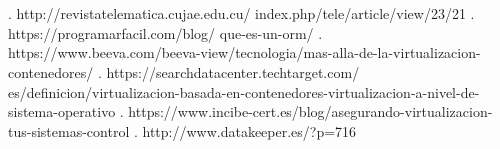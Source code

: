 \documentclass[twoside,twocolumn]{article}
\begin{document}
\begin{flushright}
\begin{itemize}
\textbf{}\\
\textbf{}\\

\begin{thebibliography}{99} %



. http://revistatelematica.cujae.edu.cu/
index.php/tele/article/view/23/21
 \break
{}. https://programarfacil.com/blog/
que-es-un-orm/
\break
{}. https://www.beeva.com/beeva-view/tecnologia/mas-alla-de-la-virtualizacion-contenedores/
\break
{}. https://searchdatacenter.techtarget.com/
es/definicion/virtualizacion-basada-en-contenedores-virtualizacion-a-nivel-de-sistema-operativo
\break
{}. https://www.incibe-cert.es/blog/asegurando-virtualizacion-tus-sistemas-control
\break
{}. http://www.datakeeper.es/?p=716
\break


\newblock {\em }
 
\end{thebibliography}

\end{itemize}
\end{flushright}
\end{document}
